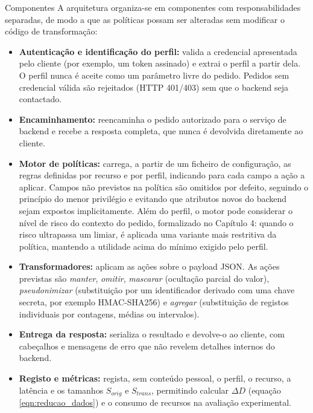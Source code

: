 \documentclass[12pt,reqno, twoside]{amsbook}
\makeatletter
\def\section{\@startsection{section}{1}%
      \z@{.5\linespacing\@plus.7\linespacing}{.25\linespacing}%
      {\normalfont\bfseries\flushleft}}
\theoremstyle{plain}
\numberwithin{equation}{chapter}
\numberwithin{table}{chapter}
\numberwithin{figure}{chapter}
\numberwithin{section}{chapter}
\makeatother
\begin{document}
\section{Componentes}
\noindent A arquitetura organiza-se em componentes com responsabilidades separadas, de modo a que as políticas possam ser alteradas sem modificar o código de transformação:
\begin{itemize}[leftmargin=*]
    \item \textbf{Autenticação e identificação do perfil:} valida a credencial apresentada pelo cliente (por exemplo, um token assinado) e extrai o perfil a partir dela. O perfil nunca é aceite como um parâmetro livre do pedido. Pedidos sem credencial válida são rejeitados (HTTP 401/403) sem que o backend seja contactado.
    \item \textbf{Encaminhamento:} reencaminha o pedido autorizado para o serviço de backend e recebe a resposta completa, que nunca é devolvida diretamente ao cliente.
    \item \textbf{Motor de políticas:} carrega, a partir de um ficheiro de configuração, as regras definidas por recurso e por perfil, indicando para cada campo a ação a aplicar. Campos não previstos na política são omitidos por defeito, seguindo o princípio do menor privilégio e evitando que atributos novos do backend sejam expostos implicitamente. Além do perfil, o motor pode considerar o nível de risco do contexto do pedido, formalizado no Capítulo 4: quando o risco ultrapassa um limiar, é aplicada uma variante mais restritiva da política, mantendo a utilidade acima do mínimo exigido pelo perfil.
    \item \textbf{Transformadores:} aplicam as ações sobre o payload JSON. As ações previstas são \textit{manter}, \textit{omitir}, \textit{mascarar} (ocultação parcial do valor), \textit{pseudonimizar} (substituição por um identificador derivado com uma chave secreta, por exemplo HMAC-SHA256) e \textit{agregar} (substituição de registos individuais por contagens, médias ou intervalos).
    \item \textbf{Entrega da resposta:} serializa o resultado e devolve-o ao cliente, com cabeçalhos e mensagens de erro que não revelem detalhes internos do backend.
    \item \textbf{Registo e métricas:} regista, sem conteúdo pessoal, o perfil, o recurso, a latência e os tamanhos $S_{orig}$ e $S_{trans}$, permitindo calcular $\Delta D$ (equação \ref{eqn:reducao_dados}) e o consumo de recursos na avaliação experimental.
\end{itemize}
\end{document}
